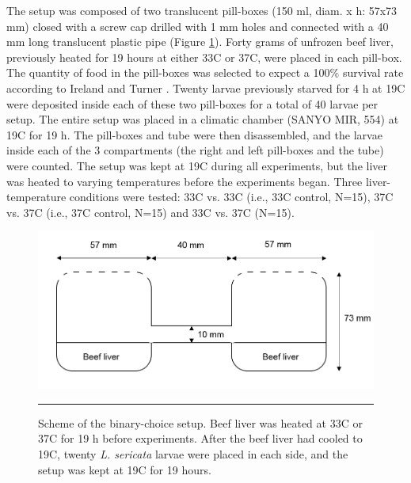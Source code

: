 The setup was composed of two translucent pill-boxes (150 ml, diam. x h: 57x73 mm) closed with a screw cap drilled with 1 mm holes and connected with a 40 mm long translucent plastic pipe (Figure \ref{fig:setupcindy}). Forty grams of unfrozen beef liver, previously heated for 19 hours at either 33C or 37C, were placed in each pill-box. The quantity of food in the pill-boxes was selected to expect a 100$\%$ survival rate according to Ireland and Turner \cite{ireland_effects_2006}. Twenty larvae previously starved for 4 h at 19C \cite{charabidze_discontinuous_2013} were deposited inside each of these two pill-boxes for a total of 40 larvae per setup. The entire setup was placed in a climatic chamber (SANYO MIR, 554) at 19C for 19 h. The pill-boxes and tube were then disassembled, and the larvae inside each of the 3 compartments (the right and left pill-boxes and the tube) were counted. The setup was kept at 19C during all experiments, but the liver was heated to varying temperatures before the experiments began. Three liver-temperature conditions were tested: 33C vs. 33C (i.e., 33C control, N=15), 37C vs. 37C (i.e., 37C control, N=15) and 33C vs. 37C (N=15). 

\begin{figure}[ht]
\centering
		\includegraphics[width=0.9 \textwidth]{Figures/setupbinarycindy.png}
		\rule{35em}{0.5pt}
		\caption[SetupCindy]{Scheme of the binary-choice setup. Beef liver was heated at 33C or 37C for 19 h before experiments. After the beef liver had cooled to 19C, twenty \textit{L. sericata} larvae were placed in each side, and the setup was kept at 19C for 19 hours.}
	\label{fig:setupcindy}
\end{figure}    
        
    
